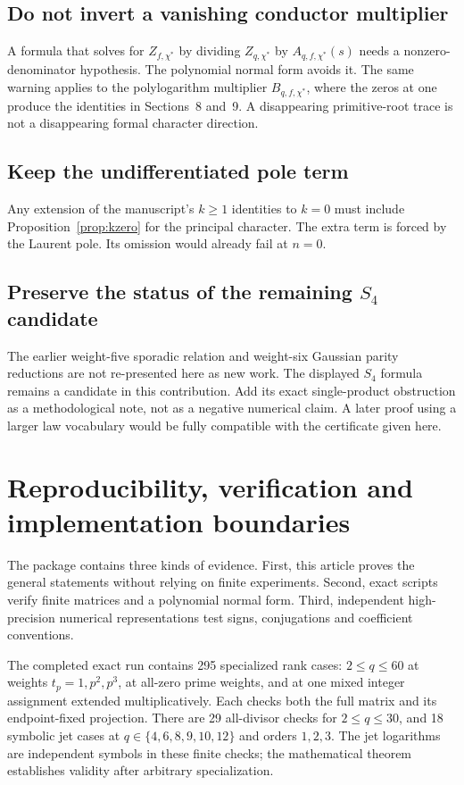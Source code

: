 \documentclass[11pt]{article}
\numberwithin{equation}{section}
\theoremstyle{definition}\newtheorem{definition}[theorem]{Definition}
\theoremstyle{remark}\newtheorem{remark}[theorem]{Remark}
\newcommand{\ch}{\chi^*}
\begin{document}
\subsection{Do not invert a vanishing conductor multiplier}

A formula that solves for $Z_{f,\ch}$ by dividing $Z_{q,\ch}$ by
$A_{q,f,\ch}(s)$ needs a nonzero-denominator hypothesis. The polynomial
normal form avoids it. The same warning applies to the polylogarithm
multiplier $B_{q,f,\ch}$, where the zeros at one produce the identities in
Sections~8 and~9. A disappearing primitive-root trace is not a disappearing
formal character direction.

\subsection{Keep the undifferentiated pole term}

Any extension of the manuscript's $k\ge1$ identities to $k=0$ must include
Proposition~\ref{prop:kzero} for the principal character. The extra term is
forced by the Laurent pole. Its omission would already fail at $n=0$.

\subsection{Preserve the status of the remaining \texorpdfstring{$S_4$}{S4} candidate}

The earlier weight-five sporadic relation and weight-six Gaussian parity
reductions are not re-presented here as new work. The displayed $S_4$
formula remains a candidate in this contribution. Add its exact
single-product obstruction as a methodological note, not as a negative
numerical claim. A later proof using a larger law vocabulary would be
fully compatible with the certificate given here.

\section{Reproducibility, verification and implementation boundaries}

The package contains three kinds of evidence. First, this article proves
the general statements without relying on finite experiments. Second,
exact scripts verify finite matrices and a polynomial normal form. Third,
independent high-precision numerical representations test signs,
conjugations and coefficient conventions.

The completed exact run contains 295 specialized rank cases: $2\le q\le60$
at weights $t_p=1,p^2,p^3$, at all-zero prime weights, and at one mixed
integer assignment extended multiplicatively. Each checks both the full
matrix and its endpoint-fixed projection. There are 29 all-divisor checks
for $2\le q\le30$, and 18 symbolic jet cases at
$q\in\{4,6,8,9,10,12\}$ and orders $1,2,3$.
The jet logarithms are independent symbols in these finite checks; the
mathematical theorem establishes validity after arbitrary specialization.
\end{document}
